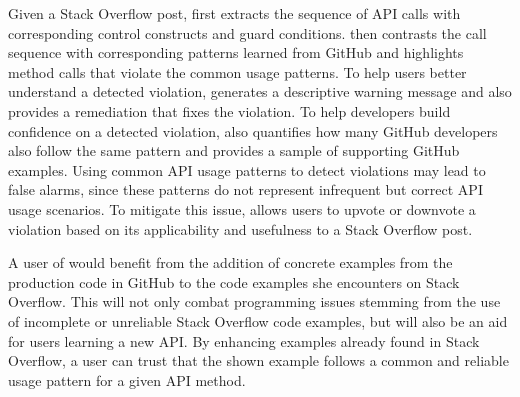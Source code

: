 Given a Stack Overflow post, {\tool} first extracts the sequence of API calls with corresponding control constructs and guard conditions. {\tool} then contrasts the call sequence with corresponding patterns learned from GitHub and highlights method calls that violate the common usage patterns. To help users better understand a detected violation, {\tool} generates a descriptive warning message and also provides a remediation that fixes the violation. To help developers build confidence on a detected violation, {\tool} also quantifies how many GitHub developers also follow the same pattern and provides a sample of supporting GitHub examples. Using common API usage patterns to detect violations may lead to false alarms, since these patterns do not represent infrequent but correct API usage scenarios. To mitigate this issue, {\tool} allows users to upvote or downvote a  violation based on its applicability and usefulness to a Stack Overflow post.

A user of {\tool} would benefit from the addition of concrete examples from the production code in GitHub to the code examples she encounters on Stack Overflow. This will not only combat programming issues stemming from the use of incomplete or unreliable Stack Overflow code examples, but will also be an aid for users learning a new API. By enhancing examples already found in Stack Overflow, a user can trust that the shown example follows a common and reliable usage pattern for a given API method.

%
